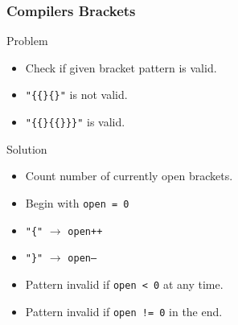 \documentclass{beamer}
\begin{document}
\begin{frame}
    \frametitle{Compilers Brackets}
    \begin{block}{Problem}
        \begin{itemize}
            \item Check if given bracket pattern is valid.
            \item {\tt"\{\{\}\{\}"} is not valid.
            \item {\tt"\{\{\}\{\{\}\}\}"} is valid.
        \end{itemize}
    \end{block} \pause
    \begin{block}{Solution}
        \begin{itemize}
            \item Count number of currently open brackets.
            \pause
            \item Begin with {\tt open = 0}
            \pause
            \item {\tt"\{"} $\rightarrow$ {\tt open++}
            \pause
            \item {\tt"\}"} $\rightarrow$ {\tt open--}
            \pause
            \item Pattern invalid if {\tt open < 0} at any time.
            \pause
            \item Pattern invalid if {\tt open != 0} in the end.
        \end{itemize}
    \end{block} 
\end{frame}
\end{document}
